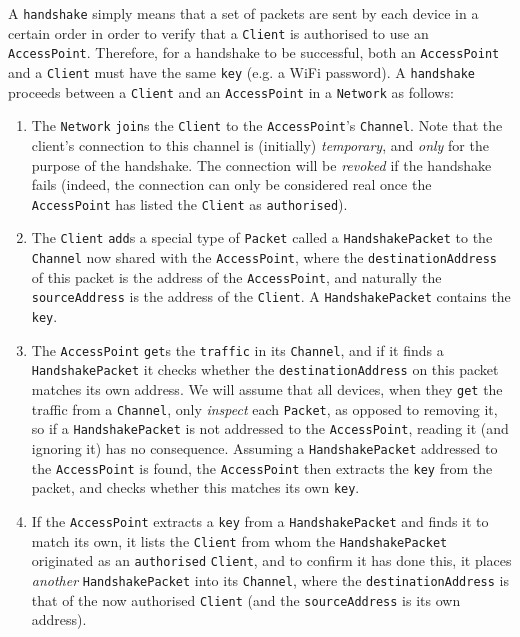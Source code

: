 \documentclass[11pt]{article}
\begin{document}
	A \texttt{handshake} simply means that a set of packets are sent by each device in a certain order in order to verify that a \texttt{Client} is authorised to use an \texttt{AccessPoint}. Therefore, for a handshake to be successful, both an \texttt{AccessPoint} and a \texttt{Client} must have the same \texttt{key} (e.g. a WiFi password). A \texttt{handshake} proceeds between a \texttt{Client} and an \texttt{AccessPoint} in a \texttt{Network} as follows:
	
	\begin{enumerate}
	
		\item The \texttt{Network} \texttt{join}s the \texttt{Client} to the \texttt{AccessPoint}'s \texttt{Channel}. Note that the client's connection to this channel is (initially) \emph{temporary}, and \emph{only} for the purpose of the handshake. The connection will be \emph{revoked} if the handshake fails (indeed, the connection can only be considered real once the \texttt{AccessPoint} has listed the \texttt{Client} as \texttt{authorised}).
		
		\item The \texttt{Client} \texttt{add}s a special type of \texttt{Packet} called a \texttt{HandshakePacket} to the \texttt{Channel} now shared with the \texttt{AccessPoint}, where the \texttt{destinationAddress} of this packet is the address of the \texttt{AccessPoint}, and naturally the \texttt{sourceAddress} is the address of the \texttt{Client}. A \texttt{HandshakePacket} contains the \texttt{key}.
			
		\item The \texttt{AccessPoint} \texttt{get}s the \texttt{traffic} in its \texttt{Channel}, and if it finds a \texttt{HandshakePacket} it checks whether the \texttt{destinationAddress} on this packet matches its own address. We will assume that all devices, when they \texttt{get} the traffic from a \texttt{Channel}, only \emph{inspect} each \texttt{Packet}, as opposed to removing it, so if a \texttt{HandshakePacket} is not addressed to the \texttt{AccessPoint}, reading it (and ignoring it) has no consequence. Assuming a \texttt{HandshakePacket} addressed to the \texttt{AccessPoint} is found, the \texttt{AccessPoint} then extracts the \texttt{key} from the packet, and checks whether this matches its own \texttt{key}.
	
		\item If the \texttt{AccessPoint} extracts a \texttt{key} from a \texttt{HandshakePacket} and finds it to match its own, it lists the \texttt{Client} from whom the \texttt{HandshakePacket} originated as an \texttt{authorised} \texttt{Client}, and to confirm it has done this, it places \emph{another} \texttt{HandshakePacket} into its \texttt{Channel}, where the \texttt{destinationAddress} is that of the now authorised \texttt{Client} (and the \texttt{sourceAddress} is its own address).
	

\end{enumerate}
\end{document}
